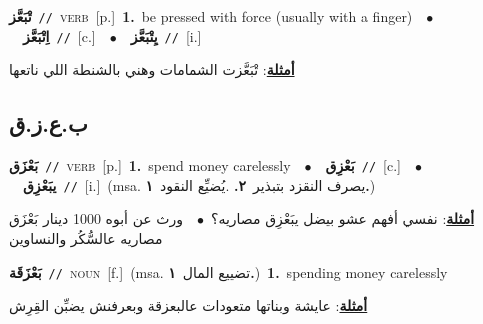\documentclass[10pt,a4paper,twoside]{article} %
\begin{document}
\begin{multicols}{2}
{\setlength\topsep{0pt}\textbf{\foreignlanguage{arabic}{تْبَعَّز}}\ {\color{gray}\texttt{//}\color{black}}\ \textsc{verb}\ [p.]\ \textbf{1.}~be pressed with force (usually with a finger)\ \ $\bullet$\ \ \setlength\topsep{0pt}\textbf{\foreignlanguage{arabic}{اِتْبَعَّز}}\ {\color{gray}\texttt{//}\color{black}}\ [c.]\ \ $\bullet$\ \ \setlength\topsep{0pt}\textbf{\foreignlanguage{arabic}{يِتْبَعَّز}}\ {\color{gray}\texttt{//}\color{black}}\ [i.]\  \begin{flushright}\color{gray}\foreignlanguage{arabic}{\textbf{\underline{\foreignlanguage{arabic}{أمثلة}}}: تْبَعَّزت الشمامات وهني بالشنطة اللي ناتعها}\end{flushright}\color{black}} \vspace{2mm}

\vspace{-3mm}
\subsection*{\color{blue}\foreignlanguage{arabic}{ب.ع.ز.ق}\color{blue}{}} 

{\setlength\topsep{0pt}\textbf{\foreignlanguage{arabic}{بَعْزَق}}\ {\color{gray}\texttt{//}\color{black}}\ \textsc{verb}\ [p.]\ \textbf{1.}~spend money carelessly\ \ $\bullet$\ \ \setlength\topsep{0pt}\textbf{\foreignlanguage{arabic}{بَعْزِق}}\ {\color{gray}\texttt{//}\color{black}}\ [c.]\ \ $\bullet$\ \ \setlength\topsep{0pt}\textbf{\foreignlanguage{arabic}{يبَعْزِق}}\ {\color{gray}\texttt{//}\color{black}}\ [i.]\ \color{gray}(msa. \foreignlanguage{arabic}{يصرف النقزد بتبذير}~\foreignlanguage{arabic}{\textbf{٢.}}  .\foreignlanguage{arabic}{يُضيِّع النقود}~\foreignlanguage{arabic}{\textbf{١.}})\color{black}\  \begin{flushright}\color{gray}\foreignlanguage{arabic}{\textbf{\underline{\foreignlanguage{arabic}{أمثلة}}}: نفسي أفهم عشو بيضل يبَعْزِق مصاريه؟\ $\bullet$\ \  ورث عن أبوه 1000 دينار بَعْزَق مصاريه عالسُّكُر والنساوين}\end{flushright}\color{black}} \vspace{2mm}

{\setlength\topsep{0pt}\textbf{\foreignlanguage{arabic}{بَعْزَقَة}}\ {\color{gray}\texttt{//}\color{black}}\ \textsc{noun}\ [f.]\ \color{gray}(msa. \foreignlanguage{arabic}{تضييع المال}~\foreignlanguage{arabic}{\textbf{١.}})\color{black}\ \textbf{1.}~spending money carelessly\  \begin{flushright}\color{gray}\foreignlanguage{arabic}{\textbf{\underline{\foreignlanguage{arabic}{أمثلة}}}: عايشة وبناتها متعودات عالبعزقة وبعرفنش يضبِّن القِرِش}\end{flushright}\color{black}} \vspace{2mm}


\end{multicols}
\end{document}
